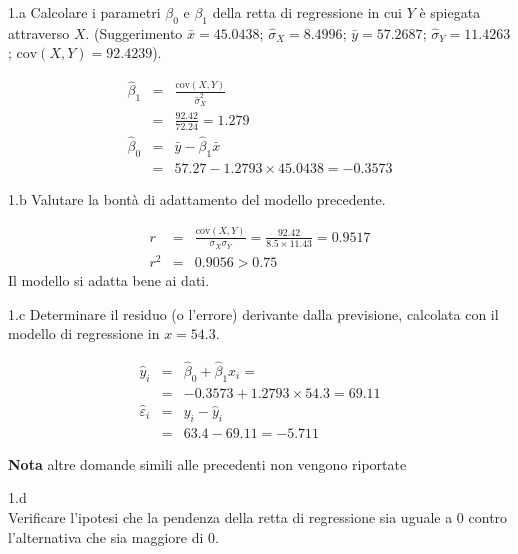 \documentclass[
  11pt,
]{book}
\theoremstyle{mytheoremstyle}
\theoremstyle{mydefstyle}
\newenvironment{sol}
  {
  \begin{tcolorbox}[enhanced,breakable,arc=0.1mm,boxrule=1pt,colback=white,colframe=iblue,
  title=\bf \fontfamily{lmss}\selectfont \hspace{.5 cm} Soluzione,drop fuzzy shadow]

}{
\end{tcolorbox}
  }
\begin{document}
1.a Calcolare i parametri \(\beta_{0}\) e \(\beta_{1}\)
della retta di regressione in cui \(Y\) è spiegata attraverso \(X\).
(Suggerimento \(\bar{x} = 45.0438\); \(\hat\sigma_{X} = 8.4996\);
\(\bar{y} = 57.2687\); \(\hat\sigma_{Y} = 11.4263\); \(\text{cov}(X,Y)= 92.4239\)).

\begin{sol}
\begin{eqnarray*}
       \hat\beta_1 &=& \frac{\text{cov}(X,Y)}{\hat\sigma_X^2} \\
            &=& \frac{ 92.42 }{ 72.24 }  =  1.279 \\
      \hat\beta_0 &=& \bar y - \hat\beta_1 \bar x\\
          &=&  57.27 - 1.2793 \times  45.0438 = -0.3573 
      \end{eqnarray*}

\end{sol}

1.b Valutare la bontà di adattamento del modello precedente.

\begin{sol}
\begin{eqnarray*}
r&=&\frac{\text{cov}(X,Y)}{\sigma_X\sigma_Y}=\frac{ 92.42 }{ 8.5 \times 11.43 }= 0.9517 \\r^2&=& 0.9056 > 0.75
\end{eqnarray*}
Il modello si adatta bene ai dati.

\end{sol}

1.c Determinare il residuo (o l'errore) derivante
dalla previsione, calcolata con il modello di regressione in \(x=54.3\).

\begin{sol}
\begin{eqnarray*}
\hat y_i &=&\hat\beta_0+\hat\beta_1 x_i=\\ 
&=& -0.3573 + 1.2793 \times 54.3 = 69.11 \\ 
\hat \varepsilon_i &=& y_i-\hat y_i\\ 
&=& 63.4 - 69.11 = -5.711  
\end{eqnarray*}

\end{sol}

\textbf{Nota} altre domande simili alle precedenti non vengono riportate

1.d\\
Verificare
l'ipotesi che la pendenza della retta di regressione sia uguale a 0
contro l'alternativa che sia maggiore di 0.
\end{document}
